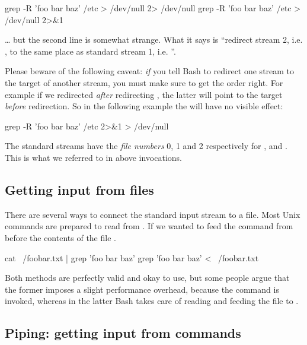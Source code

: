 \documentclass{olli-handout}
\begin{document}
\begin{lstbash}
grep -R 'foo bar baz' /etc > /dev/null 2> /dev/null
grep -R 'foo bar baz' /etc > /dev/null 2>&1
\end{lstbash}

\ldots{} but the second line is somewhat strange. What it says is ``redirect stream 2, i.e. , to the same place as standard stream 1, i.e. ''.

\begin{hintbox}
    {\olliHandLeft} Please beware of the following caveat: \emph{if} you tell Bash to redirect one stream to the target of another stream, you must make sure to get the order right. For example if we redirected  \emph{after} redirecting , the latter will point to the target \emph{before} redirection. So in the following example the  will have no visible effect:

\begin{lstbash}[true]
grep -R 'foo bar baz' /etc 2>&1 > /dev/null
\end{lstbash}

    {\olliPenR} The standard streams have the \emph{file numbers} 0, 1 and 2 respectively for ,  and . This is what we referred to in above invocations.
\end{hintbox}

\subsection{Getting input from files}

There are several ways to connect the standard input stream to a file. Most Unix commands are prepared to read from . If we wanted to feed the  command from before the contents of the file .

\begin{lstbash}
cat ~/foobar.txt | grep 'foo bar baz'
grep 'foo bar baz' < ~/foobar.txt
\end{lstbash}

Both methods are perfectly valid and okay to use, but some people argue that the former imposes a slight performance overhead, because the  command is invoked, whereas in the latter Bash takes care of reading and feeding the file to .

\subsection{Piping: getting input from commands}\label{pipes}
\end{document}
